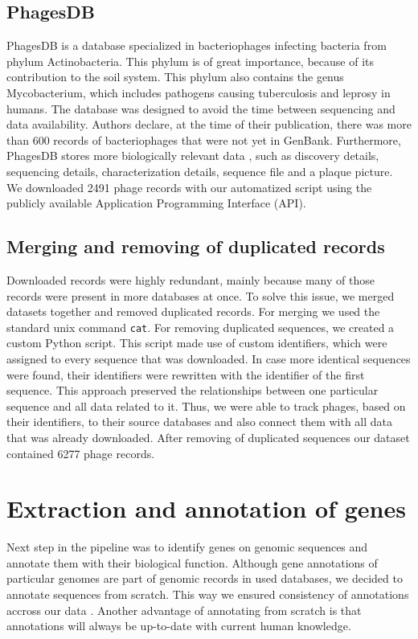 
\subsection{PhagesDB}
PhagesDB is a database specialized in bacteriophages infecting bacteria from phylum Actinobacteria.
This phylum is of great importance, because of its contribution to the soil system.
This phylum also contains the genus Mycobacterium, which includes pathogens causing tuberculosis and leprosy in humans.
The database was designed to avoid the time between sequencing and data availability.
Authors declare, at the time of their publication, there was more than 600 records of bacteriophages that were not yet in GenBank.
Furthermore, PhagesDB stores more biologically relevant data , such as discovery details, sequencing details, characterization details, sequence file and a plaque picture.
We downloaded 2491 phage records with our automatized script using the publicly available Application Programming Interface (API).

\subsection{Merging and removing of duplicated records}
Downloaded records were  highly redundant, mainly because many of those records were present in  more databases at once.
To solve this issue, we merged datasets together and removed duplicated records.
For merging we used the standard unix command \verb|cat|.
For removing duplicated sequences, we created a custom Python script.
This script made use of custom identifiers, which were assigned to every sequence that was downloaded.
In case more identical sequences were found, their identifiers were rewritten with the identifier of the first sequence.
This approach preserved the relationships between one particular sequence and all data related to it.
Thus, we were able to track phages, based on their identifiers, to their source databases and also connect them with all data that was already downloaded.
After removing of duplicated sequences our dataset contained 6277 phage records.

\section{Extraction and annotation of genes}
Next step in the pipeline was to identify genes on genomic sequences and annotate them with their biological function.
Although gene annotations of particular genomes are part of genomic records in used databases, we decided to annotate sequences from scratch.
This way we ensured consistency of annotations accross our data .
Another advantage of annotating from scratch is that annotations will always be up-to-date with current human knowledge.

